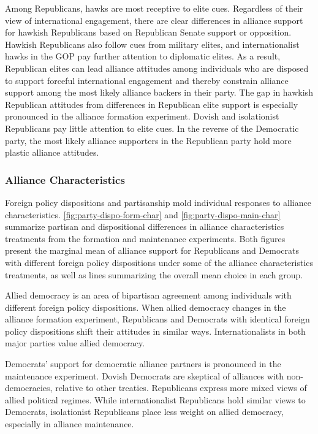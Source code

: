 \documentclass[12pt]{article}
\begin{document}
Among Republicans, hawks are most receptive to elite cues. 
Regardless of their view of international engagement, there are clear differences in alliance support for hawkish Republicans based on Republican Senate support or opposition.
Hawkish Republicans also follow cues from military elites, and internationalist hawks in the GOP pay further attention to diplomatic elites. 
As a result, Republican elites can lead alliance attitudes among individuals who are disposed to support forceful international engagement and thereby constrain alliance support among the most likely alliance backers in their party. 
The gap in hawkish Republican attitudes from differences in Republican elite support is especially pronounced in the alliance formation experiment. 
Dovish and isolationist Republicans pay little attention to elite cues. 
In the reverse of the Democratic party, the most likely alliance supporters in the Republican party hold more plastic alliance attitudes. 



\subsubsection{Alliance Characteristics}



Foreign policy dispositions and partisanship mold individual responses to alliance characteristics. 
\autoref{fig:party-dispo-form-char} and \autoref{fig:party-dispo-main-char} summarize partisan and dispositional differences in alliance characteristics treatments from the formation and maintenance experiments. 
Both figures present the marginal mean of alliance support for Republicans and Democrats with different foreign policy dispositions under some of the alliance characteristics treatments, as well as lines summarizing the overall mean choice in each group. 


Allied democracy is an area of bipartisan agreement among individuals with different foreign policy dispositions.
When allied democracy changes in the alliance formation experiment, Republicans and Democrats with identical foreign policy dispositions shift their attitudes in similar ways. 
Internationalists in both major parties value allied democracy. 


Democrats' support for democratic alliance partners is pronounced in the maintenance experiment. 
Dovish Democrats are skeptical of alliances with non-democracies, relative to other treaties. 
Republicans express more mixed views of allied political regimes. 
While internationalist Republicans hold similar views to Democrats, isolationist Republicans place less weight on allied democracy, especially in alliance maintenance. 
\end{document}

